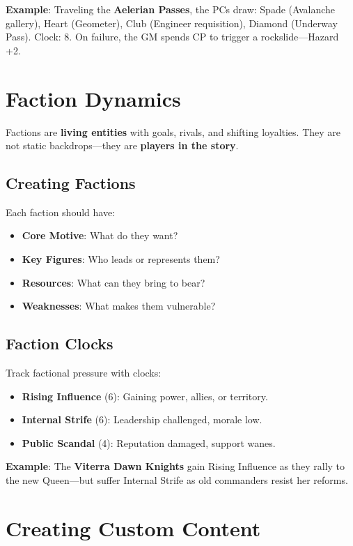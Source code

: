 \textbf{Example}: Traveling the \textbf{Aelerian Passes}, the PCs draw: Spade (Avalanche gallery), Heart (Geometer), Club (Engineer requisition), Diamond (Underway Pass). Clock: 8. On failure, the GM spends CP to trigger a rockslide—Hazard +2.

\section*{Faction Dynamics}

Factions are \textbf{living entities} with goals, rivals, and shifting loyalties. They are not static backdrops—they are \textbf{players in the story}.

\subsection*{Creating Factions}

Each faction should have:

\begin{itemize}
    \item \textbf{Core Motive}: What do they want?
    \item \textbf{Key Figures}: Who leads or represents them?
    \item \textbf{Resources}: What can they bring to bear?
    \item \textbf{Weaknesses}: What makes them vulnerable?
\end{itemize}

\subsection*{Faction Clocks}

Track factional pressure with clocks:

\begin{itemize}
    \item \textbf{Rising Influence} (6): Gaining power, allies, or territory.
    \item \textbf{Internal Strife} (6): Leadership challenged, morale low.
    \item \textbf{Public Scandal} (4): Reputation damaged, support wanes.
\end{itemize}

\textbf{Example}: The \textbf{Viterra Dawn Knights} gain Rising Influence as they rally to the new Queen—but suffer Internal Strife as old commanders resist her reforms.

\section*{Creating Custom Content}

